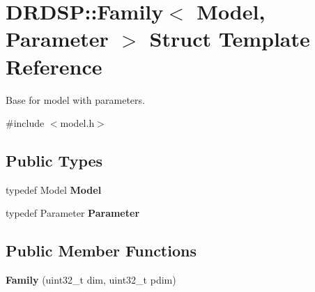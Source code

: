 \hypertarget{struct_d_r_d_s_p_1_1_family}{\section{D\-R\-D\-S\-P\-:\-:Family$<$ Model, Parameter $>$ Struct Template Reference}
\label{struct_d_r_d_s_p_1_1_family}
}


Base for model with parameters.  




{\ttfamily \#include $<$model.\-h$>$}

\subsection*{Public Types}
\begin{DoxyCompactItemize}
\item 
\hypertarget{struct_d_r_d_s_p_1_1_family_a4b95d783ae1e4463682c8a6d2d92ba60}{typedef Model {\bfseries Model}}\label{struct_d_r_d_s_p_1_1_family_a4b95d783ae1e4463682c8a6d2d92ba60}

\item 
\hypertarget{struct_d_r_d_s_p_1_1_family_a7c850dabdb267d80256d7550f040d800}{typedef Parameter {\bfseries Parameter}}\label{struct_d_r_d_s_p_1_1_family_a7c850dabdb267d80256d7550f040d800}

\end{DoxyCompactItemize}
\subsection*{Public Member Functions}
\begin{DoxyCompactItemize}
\item 
\hypertarget{struct_d_r_d_s_p_1_1_family_a28adae3e0ab94e8da5ae16a747894406}{{\bfseries Family} (uint32\-\_\-t dim, uint32\-\_\-t pdim)}\label{struct_d_r_d_s_p_1_1_family_a28adae3e0ab94e8da5ae16a747894406}

\end{DoxyCompactItemize}
